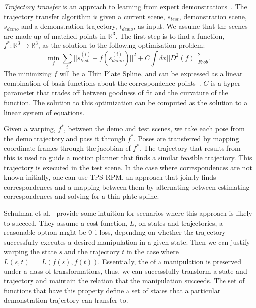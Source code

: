 \emph{Trajectory transfer} is an approach to learning from expert demonstrations~\cite{Schulmanetal_ISRR2013}. The trajectory transfer
algorithm is given a current scene, $s_{test}$, demonstration scene, $s_{demo}$ and a demonstration trajectory,  
$t_{demo}$, as input. We assume that the scenes are made up of matched points in $\mathbb{R}^3$. The first step is to 
find a function, $f^*:\mathbb{R}^3 \rightarrow \mathbb{R}^3$, as the solution to the following optimization problem:
\begin{equation}\min_f \sum_i ||s_{test}^{(i)} - f(s_{demo}^{(i)})||^2 + C\int dx ||D^2(f)||^2_{Frob}.\label{eq:tps}\end{equation}
The minimizing $f$ will be a Thin Plate Spline, and can be expressed as a linear combination of basis
functions about the correspondence points~\cite{Wahba_TPS1990}. $C$ is a hyper-parameter that trades off
between goodness of fit and the curvature of the function. The solution to this optimization can be computed
as the solution to a linear system of equations.

Given a warping, $f^*$, between the demo and test scenes, we take each pose from the demo trajectory and pass it through
$f^*$. Poses are transferred by mapping coordinate frames through the jacobian of $f^*$. The trajectory that results from this
is used to guide a motion planner that finds a similar feasible trajectory. This trajectory is executed in the test scene.
In the case where correspondences are not known initially, one can use TPS-RPM, an approach that jointly finds
correspondences and a mapping between them by alternating between estimating correspondences and solving for 
a thin plate spline\cite{Chui_CVIU2003}.

Schulman et al.~\cite{Schulmanetal_ISRR2013} provide some intuition for scenarios where this approach is likely
to succeed. They assume a cost function, $L$, on states and trajectories, a reasonable option might be 0-1 loss, depending
on whether the trajectory successfully executes a desired manipulation in a given state.  Then we can justify warping the
state $s$ and the trajectory $t$ 
in the case where $L(s, t)~=~L(f(s), f(t))$. Essentially, the of a manipulation is preserved under a class of transformations,
thus, we can successfully transform a state and trajectory and maintain the relation that the manipulation succeeds. The set of functions
that have this property define a set of states that a particular demonstration trajectory can transfer to.

